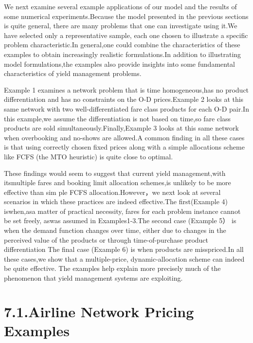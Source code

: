 We next examine several example applications of our model and the
results of some numerical experiments.Because the model presented in the
previous sections is quite general, there are many problems that one can
investigate using it.We have selected only a representative sample, each
one chosen to illustrate a specific problem characteristic.In
general,one could combine the characteristics of these examples to
obtain increasingly realistic formulations.In addition to illustrating
model formulations,the examples also provide insights into some
fundamental characteristics of yield management problems.

Example 1 examines a network problem that is time homogeneous,has no
product differentiation and has no constraints on the O-D prices.Example
2 looks at this same network with two well-differentiated fare class
products for each O-D pair.In this example,we assume the differentiation
is not based on time,so fare class products are sold
simultaneously.Finally,Example 3 looks at this same network when
overbooking and no-shows are allowed.A common finding in all these cases
is that using correctly chosen fixed prices along with a simple
allocations scheme like FCFS (the MTO heuristic) is quite close to
optimal.

These findings would seem to suggest that current yield management,with
itsmultiple fares and booking limit allocation schemes,is unlikely to be
more effective than sim ple FCFS allocation.However，we next look at
several scenarios in which these practices are indeed effective.The
first(Example 4) iswhen,asa matter of practical necessity, fares for
each problem instance cannot be set freely, aswas assumed in
Examples1-3.The second case (Example 5） is when the demand function
changes over time, either due to changes in the perceived value of the
products or through time-of-purchase product differentiation The final
case (Example 6) is when products are misspriced.In all these cases,we
show that a multiple-price, dynamic-allocation scheme can indeed be
quite effective. The examples help explain more precisely much of the
phenomenon that yield management systems are exploiting.

\section{7.1.Airline Network Pricing
Examples}\label{airline-network-pricing-examples}

